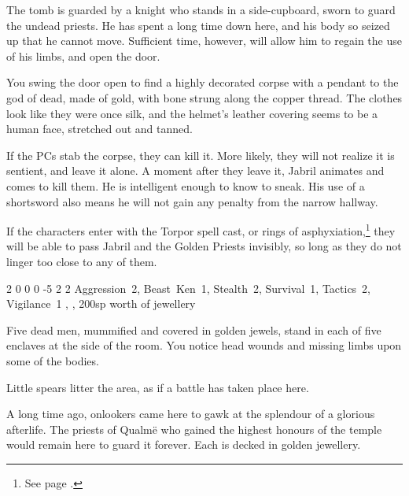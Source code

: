 \begin{multicols}{2}
The tomb is guarded by a knight who stands in a side-cupboard, sworn to guard the undead priests.
He has spent a long time down here, and his body so seized up that he cannot move.
Sufficient time, however, will allow him to regain the use of his limbs, and open the door.

\begin{boxtext}

	You swing the door open to find a highly decorated corpse with a pendant to the god of dead, made of gold, with bone strung along the copper thread.
	The clothes look like they were once silk, and the helmet's leather covering seems to be a human face, stretched out and tanned.

\end{boxtext}

If the PCs stab the corpse, they can kill it.
More likely, they will not realize it is sentient, and leave it alone.
A moment after they leave it, Jabril animates and comes to kill them.
He is intelligent enough to know to sneak.
His use of a shortsword also means he will not gain any penalty from the narrow hallway.

If the characters enter with the Torpor spell cast, or rings of asphyxiation,\footnote{See page \pageref{ring_asphyxiation}.} they will be able to pass Jabril and the Golden Priests invisibly, so long as they do not linger too close to any of them.


	{2}%
	{0}%
	{{0}%
	{0}%
	{-5}}%
	{2}%
	{2}%
	{Aggression~2, Beast~Ken~1, Stealth~2, Survival~1, Tactics~2, Vigilance~1}%
	{\shortsword, \completeplate, 200sp worth of jewellery}%
	{}


\begin{boxtext}

	Five dead men, mummified and covered in golden jewels, stand in each of five enclaves at the side of the room.
	You notice head wounds and missing limbs upon some of the bodies.

	Little spears litter the area, as if a battle has taken place here.

\end{boxtext}

\begin{exampletext}

A long time ago, onlookers came here to gawk at the splendour of a glorious afterlife.  The priests of Qualm\"{e} who gained the highest honours of the temple would remain here to guard it forever.  Each is decked in golden jewellery.


\end{exampletext}
\end{multicols}
